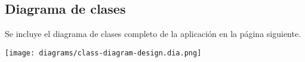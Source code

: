 \subsection{Diagrama de clases}

Se incluye el diagrama de clases completo de la aplicación en la página
siguiente.

\begin{sidewaysfigure}
    \texttt{[image: diagrams/class-diagram-design.dia.png]}
\end{sidewaysfigure}
